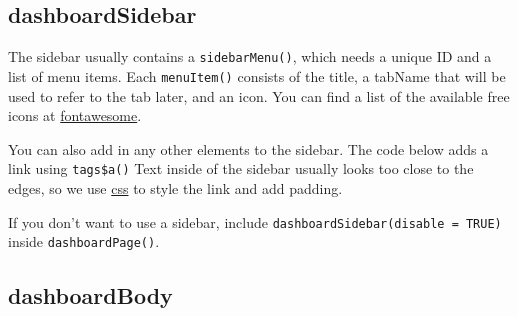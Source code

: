 \documentclass[
  oneside]{book}
\newenvironment{Shaded}{\begin{snugshade}}{\end{snugshade}}
\newcommand{\AttributeTok}[1]{\textcolor[rgb]{0.77,0.63,0.00}{#1}}
\newcommand{\FunctionTok}[1]{\textcolor[rgb]{0.00,0.00,0.00}{#1}}
\newcommand{\NormalTok}[1]{#1}
\newcommand{\SpecialCharTok}[1]{\textcolor[rgb]{0.00,0.00,0.00}{#1}}
\newcommand{\StringTok}[1]{\textcolor[rgb]{0.31,0.60,0.02}{#1}}
\begin{document}
\hypertarget{dashboardsidebar}{%
\subsection{dashboardSidebar}\label{dashboardsidebar}}

The sidebar usually contains a \texttt{sidebarMenu}\texttt{()}, which needs a unique ID and a list of menu items. Each \texttt{menuItem}\texttt{()} consists of the \AttributeTok{title}, a \AttributeTok{tabName} that will be used to refer to the tab later, and an \AttributeTok{icon}. You can find a list of the available free icons at \href{https://fontawesome.com/icons?d=gallery\&m=free}{fontawesome}.

You can also add in any other elements to the sidebar. The code below adds a link using \texttt{tags\$a}\texttt{()} Text inside of the sidebar usually looks too close to the edges, so we use \protect\hyperlink{CSS}{css} to style the link and add padding.

\begin{Shaded}
\end{Shaded}

\begin{info}
If you don't want to use a sidebar, include \texttt{dashboardSidebar(disable\ =\ TRUE)} inside \texttt{dashboardPage}\texttt{()}.

\end{info}

\hypertarget{dashboardbody}{%
\subsection{dashboardBody}\label{dashboardbody}}
\end{document}
